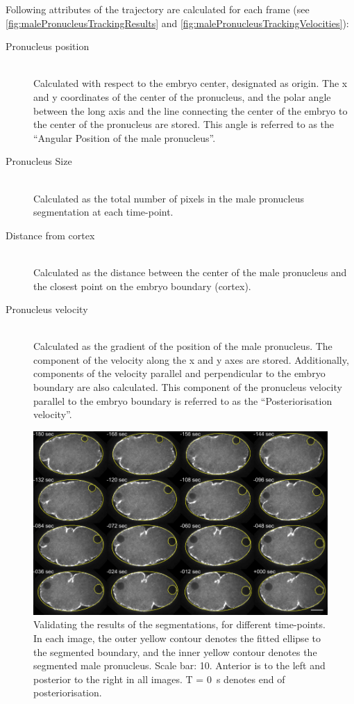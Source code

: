 Following attributes of the trajectory are calculated for each frame (see \autoref{fig:malePronucleusTrackingResults} and \autoref{fig:malePronucleusTrackingVelocities}):
\begin{description}
    \item[Pronucleus position]\hfill\\
    Calculated with respect to the embryo center, designated as origin. The x and y coordinates of the center of the pronucleus, and the polar angle between the long axis and the line connecting the center of the embryo to the center of the pronucleus are stored. This angle is referred to as the \enquote{Angular Position of the male pronucleus}.
    \item[Pronucleus Size]\hfill\\
    Calculated as the total number of pixels in the male pronucleus segmentation at each time-point.
    \item[Distance from cortex]\hfill\\
    Calculated as the distance between the center of the male pronucleus and the closest point on the embryo boundary (cortex).
    \item[Pronucleus velocity]\hfill\\
    Calculated as the gradient of the position of the male pronucleus. The component of the velocity along the x and y axes are stored. Additionally, components of the velocity parallel and perpendicular to the embryo boundary are also calculated. This component of the pronucleus velocity parallel to the embryo boundary is referred to as the \enquote{Posteriorisation velocity}.
\end{description}

\begin{figure}[p]
\centering
\includegraphics[width=\textwidth]{ExpMethods/FigTrackNucleus/validate.pdf}
\caption[Image analysis: Validation]{Validating the results of the segmentations, for different time-points. In each image, the outer yellow contour denotes the fitted ellipse to the segmented boundary, and the inner yellow contour denotes the segmented male pronucleus. Scale bar: \SI{10}{\unitLength}. Anterior is to the left and posterior to the right in all images. T = \SI{0}{\second} denotes end of posteriorisation.}
\label{fig:validateSegmentations}
\end{figure}

